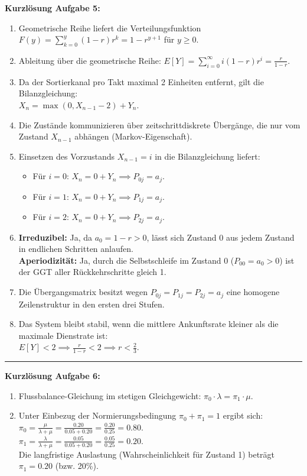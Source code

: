 \documentclass[11pt,a4paper]{article}
\begin{document}
\textbf{Kurzlösung Aufgabe 5:}
\begin{enumerate}
    \item[a)] Geometrische Reihe liefert die Verteilungsfunktion $F(y) = \sum_{k=0}^y (1-r)r^k = 1 - r^{y+1}$ für $y \ge 0$.
    \item[b)] Ableitung über die geometrische Reihe: $E[Y] = \sum_{i=0}^{\infty} i(1-r)r^i = \frac{r}{1-r}$.
    \item[c)] Da der Sortierkanal pro Takt maximal 2 Einheiten entfernt, gilt die Bilanzgleichung: \\
    $X_n = \max(0, X_{n-1} - 2) + Y_n$.
    \item[d)] Die Zustände kommunizieren über zeitschrittdiskrete Übergänge, die nur vom Zustand $X_{n-1}$ abhängen (Markov-Eigenschaft).
    \item[e)] Einsetzen des Vorzustands $X_{n-1} = i$ in die Bilanzgleichung liefert:
    \begin{itemize}
        \item Für $i=0$: $X_n = 0 + Y_n \implies P_{0j} = a_j$.
        \item Für $i=1$: $X_n = 0 + Y_n \implies P_{1j} = a_j$.
        \item Für $i=2$: $X_n = 0 + Y_n \implies P_{2j} = a_j$.
    \end{itemize}
    \item[f)] \textbf{Irreduzibel:} Ja, da $a_0 = 1-r > 0$, lässt sich Zustand 0 aus jedem Zustand in endlichen Schritten anlaufen. \\
    \textbf{Aperiodizität:} Ja, durch die Selbstschleife im Zustand 0 ($P_{00} = a_0 > 0$) ist der GGT aller Rückkehrschritte gleich 1.
    \item[g)] Die Übergangsmatrix besitzt wegen $P_{0j}=P_{1j}=P_{2j}=a_j$ eine homogene Zeilenstruktur in den ersten drei Stufen.
    \item[h)] Das System bleibt stabil, wenn die mittlere Ankunftsrate kleiner als die maximale Dienstrate ist: \\
    $E[Y] < 2 \implies \frac{r}{1-r} < 2 \implies r < \frac{2}{3}$.
\end{enumerate}

\hrule
\vspace{0.4cm}

\textbf{Kurzlösung Aufgabe 6:}
\begin{enumerate}
    \item[a)] Flussbalance-Gleichung im stetigen Gleichgewicht: $\pi_0 \cdot \lambda = \pi_1 \cdot \mu$.
    \item[b)] Unter Einbezug der Normierungsbedingung $\pi_0 + \pi_1 = 1$ ergibt sich: \\
    $\pi_0 = \frac{\mu}{\lambda + \mu} = \frac{0.20}{0.05 + 0.20} = \frac{0.20}{0.25} = 0.80.$ \\
    $\pi_1 = \frac{\lambda}{\lambda + \mu} = \frac{0.05}{0.05 + 0.20} = \frac{0.05}{0.25} = 0.20.$ \\
    Die langfristige Auslastung (Wahrscheinlichkeit für Zustand 1) beträgt $\pi_1 = 0.20$ (bzw. 20\%).
\end{enumerate}
\end{document}
